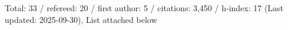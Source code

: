 Total: 33 / refereed: 20 / first author: 5 / citations: 3,450 / h-index: 17 (Last updated: 2025-09-30), List attached below